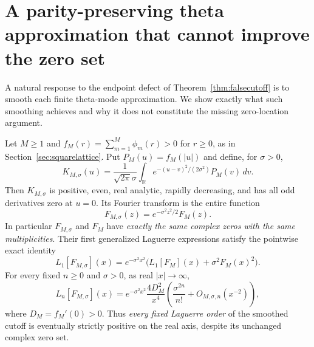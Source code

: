 \section{A parity-preserving theta approximation that cannot improve the zero set}
\label{sec:gaussianrepair}
A natural response to the endpoint defect of
Theorem~\ref{thm:falsecutoff} is to smooth each finite
theta-mode approximation. We show exactly what such
smoothing achieves and why it does not constitute
the missing zero-location argument.

\begin{theorem}
\label{thm:parityrepair}
Let $M\ge1$ and
$f_M(r)=\sum_{m=1}^{M}\phi_m(r)>0$ for $r\ge0$,
as in Section~\ref{sec:squarelattice}. Put
$P_M(u)=f_M(|u|)$ and define, for $\sigma>0$,
\begin{equation}
K_{M,\sigma}(u)=
\frac{1}{\sqrt{2\pi}\sigma}
\int_{\mathbb R}
e^{-(u-v)^2/(2\sigma^2)}P_M(v)\,dv .
\label{eq:parityrepairK}
\end{equation}
Then $K_{M,\sigma}$ is positive, even, real
analytic, rapidly decreasing, and has all odd
derivatives zero at $u=0$.
Its Fourier transform is the entire function
\begin{equation}
\boxed{
F_{M,\sigma}(z)=e^{-\sigma^2z^2/2}F_M(z).
}
\label{eq:parityrepairF}
\end{equation}
In particular $F_{M,\sigma}$ and $F_M$
have \emph{exactly the same complex zeros
with the same multiplicities}.
Their first generalized Laguerre expressions
satisfy the pointwise exact identity
\begin{equation}
\boxed{
L_1[F_{M,\sigma}](x)
=e^{-\sigma^2x^2}
\bigl(L_1[F_M](x)+\sigma^2F_M(x)^2\bigr).
}
\label{eq:parityrepairL}
\end{equation}
For every fixed $n\ge0$ and $\sigma>0$,
as real $|x|\to\infty$,
\begin{equation}
\boxed{
L_n[F_{M,\sigma}](x)
=e^{-\sigma^2x^2}\frac{4D_M^2}{x^4}
\left(\frac{\sigma^{2n}}{n!}
+O_{M,\sigma,n}(x^{-2})\right),
}
\label{eq:parityrepairasym}
\end{equation}
where $D_M=f_M'(0)>0$.
Thus \emph{every fixed Laguerre order} of
the smoothed cutoff is eventually strictly
positive on the real axis, despite its
unchanged complex zero set.
\end{theorem}

